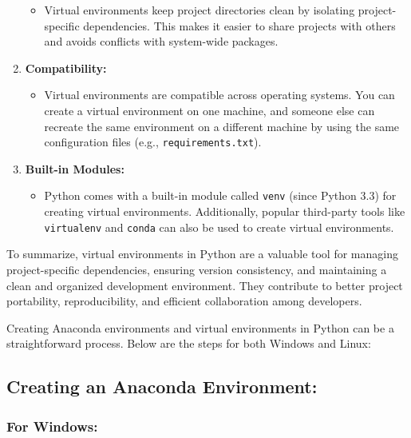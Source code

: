 \documentclass[
  letterpaper,
  DIV=11,
  numbers=noendperiod]{scrreprt}
\providecommand{\tightlist}{%
  \setlength{\itemsep}{0pt}\setlength{\parskip}{0pt}}\usepackage{longtable,booktabs,array}
\begin{document}
\begin{enumerate}
  \begin{itemize}
  \tightlist
  \item
    Virtual environments keep project directories clean by isolating
    project-specific dependencies. This makes it easier to share
    projects with others and avoids conflicts with system-wide packages.
  \end{itemize}
\item
  \textbf{Compatibility:}

  \begin{itemize}
  \tightlist
  \item
    Virtual environments are compatible across operating systems. You
    can create a virtual environment on one machine, and someone else
    can recreate the same environment on a different machine by using
    the same configuration files (e.g., \texttt{requirements.txt}).
  \end{itemize}
\item
  \textbf{Built-in Modules:}

  \begin{itemize}
  \tightlist
  \item
    Python comes with a built-in module called \texttt{venv} (since
    Python 3.3) for creating virtual environments. Additionally, popular
    third-party tools like \texttt{virtualenv} and \texttt{conda} can
    also be used to create virtual environments.
  \end{itemize}
\end{enumerate}

To summarize, virtual environments in Python are a valuable tool for
managing project-specific dependencies, ensuring version consistency,
and maintaining a clean and organized development environment. They
contribute to better project portability, reproducibility, and efficient
collaboration among developers.

Creating Anaconda environments and virtual environments in Python can be
a straightforward process. Below are the steps for both Windows and
Linux:

\subsection{Creating an Anaconda
Environment:}\label{creating-an-anaconda-environment}

\subsubsection{For Windows:}\label{for-windows}
\end{document}
